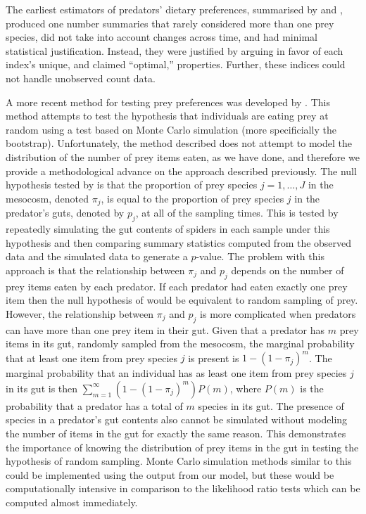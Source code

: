 \documentclass[smallextended]{svjour3}
\begin{document}
The earliest estimators of predators' dietary preferences, summarised by \citet{Lechowicz:1982} and \citet{Manly:2002}, produced one number summaries that rarely considered more than one prey species, did not take into account changes across time, and had minimal statistical justification.  Instead, they were justified by arguing in favor of each index's unique, and claimed ``optimal,'' properties.  Further, these indices could not handle unobserved count data.

A more recent method for testing prey preferences was developed by \citet{Agusti:2003}.  This method attempts to test the hypothesis that individuals are eating prey at random using a test based on Monte Carlo simulation (more specificially the bootstrap).  Unfortunately, the method described does not attempt to model the distribution of the number of prey items eaten, as we have done, and therefore we provide a methodological advance on the approach described previously.  The null hypothesis tested by \citet{Agusti:2003} is that the proportion of prey species $j=1,\ldots,J$ in the mesocosm, denoted $\pi_j$, is equal to the proportion of prey species $j$ in the predator's guts, denoted by $p_j$, at all of the sampling times.  This is tested by repeatedly simulating the gut contents of spiders in each sample under this hypothesis and then comparing summary statistics computed from the observed data and the simulated data to generate a $p$-value.  The problem with this approach is that the relationship between $\pi_j$ and $p_j$ depends on the number of prey items eaten by each predator.  If each predator had eaten exactly one prey item then the null hypothesis of \citet{Agusti:2003} would be equivalent to random sampling of prey.  However, the relationship between $\pi_j$ and $p_j$ is more complicated when predators can have more than one prey item in their gut.  Given that a predator has $m$ prey items in its gut, randomly sampled from the mesocosm, the marginal probability that at least one item from prey species $j$ is present is $1-(1-\pi_j)^m$.  The marginal probability that an individual has as least one item from prey species $j$ in its gut is then $\sum_{m=1}^{\infty} (1-(1-\pi_j)^m)P(m)$, where $P(m)$ is the probability that a predator has a total of $m$ species in its gut.  The presence of species in a predator's gut contents also cannot be simulated without modeling the number of items in the gut for exactly the same reason.  This demonstrates the importance of knowing the distribution of prey items in the gut in testing the hypothesis of random sampling.  Monte Carlo simulation methods similar to this could be implemented using the output from our model, but these would be computationally intensive in comparison to the likelihood ratio tests which can be computed almost immediately.
\end{document}
